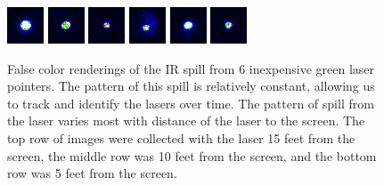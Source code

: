 \begin{figure}
\includegraphics[width=0.16\linewidth]{images/SpotPPMs/tagged_2_frame_599_point_FC_0.png}
\includegraphics[width=0.16\linewidth]{images/SpotPPMs/tagged_5_frame_838_point_FC_0.png}
\includegraphics[width=0.16\linewidth]{images/SpotPPMs/tagged_8_frame_1085_point_FC_0.png}
\includegraphics[width=0.16\linewidth]{images/SpotPPMs/tagged_11_frame_1328_point_FC_0.png}
\includegraphics[width=0.16\linewidth]{images/SpotPPMs/tagged_14_frame_1594_point_FC_0.png}
\includegraphics[width=0.16\linewidth]{images/SpotPPMs/tagged_17_frame_1819_point_FC_0.png}

\vspace{-0.1in}
  \caption[False color renderings of laser IR spill]{\label{figure:laser_dots} 
False color renderings of the IR spill from 6 inexpensive green laser
pointers.  The pattern of this spill is relatively constant, allowing
us to track and identify the lasers over time.  The pattern of spill
from the laser varies most with distance of the laser to the screen.
The top row of images were collected with the laser 15 feet from the
screen, the middle row was 10 feet from the screen, and the bottom row was 5 feet from the screen.
}
\end{figure}

